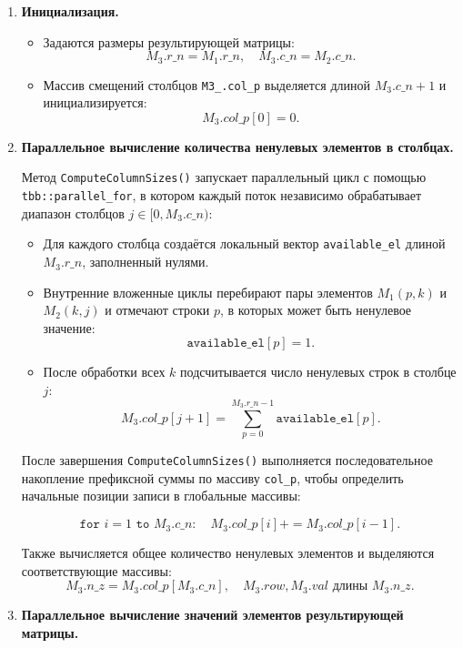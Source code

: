 \documentclass[12pt]{article}
\begin{document}
\begin{enumerate}
  \item \textbf{Инициализация.}
  \begin{itemize}
    \item Задаются размеры результирующей матрицы:
    \[
      M_3.r\_n = M_1.r\_n,\quad
      M_3.c\_n = M_2.c\_n.
    \]
    \item Массив смещений столбцов \texttt{M3\_}\texttt{.col\_p} выделяется длиной \(M_3.c\_n + 1\) и инициализируется:
    \[
      M_3.col\_p[0] = 0.
    \]
  \end{itemize}

  \item \textbf{Параллельное вычисление количества ненулевых элементов в столбцах.}

  Метод \texttt{ComputeColumnSizes()} запускает параллельный цикл с помощью \texttt{tbb::parallel\_for}, в котором каждый поток независимо обрабатывает диапазон столбцов \(j \in [0, M_3.c\_n)\):

  \begin{itemize}
    \item Для каждого столбца создаётся локальный вектор \texttt{available\_el} длиной \(M_3.r\_n\), заполненный нулями.
    \item Внутренние вложенные циклы перебирают пары элементов \(M_1(p,k)\) и \(M_2(k,j)\) и отмечают строки \(p\), в которых может быть ненулевое значение:
    \[
      \texttt{available\_el}[p] = 1.
    \]
    \item После обработки всех \(k\) подсчитывается число ненулевых строк в столбце \(j\):
    \[
      M_3.col\_p[j+1] = \sum_{p=0}^{M_3.r\_n - 1} \texttt{available\_el}[p].
    \]
  \end{itemize}

  После завершения \texttt{ComputeColumnSizes()} выполняется последовательное накопление префиксной суммы по массиву \texttt{col\_p}, чтобы определить начальные позиции записи в глобальные массивы:

  \[
    \texttt{for } i = 1 \texttt{ to } M_3.c\_n: \quad
    M_3.col\_p[i] += M_3.col\_p[i-1].
  \]

  Также вычисляется общее количество ненулевых элементов и выделяются соответствующие массивы:
  \[
    M_3.n\_z = M_3.col\_p[M_3.c\_n], \quad
    M_3.row, M_3.val \text{ длины } M_3.n\_z.
  \]

  \item \textbf{Параллельное вычисление значений элементов результирующей матрицы.}


\end{enumerate}
\end{document}
